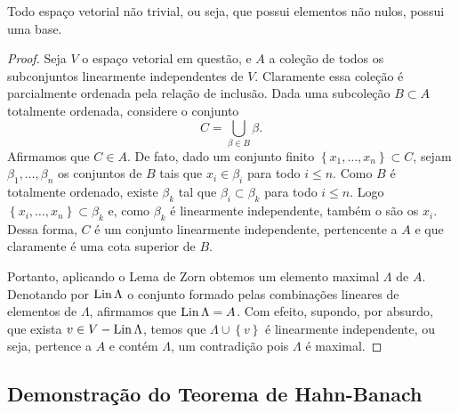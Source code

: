 \begin{prop}
    Todo espaço vetorial não trivial, ou seja, que possui elementos não nulos, possui uma base.
\end{prop}
\begin{proof}
    Seja \( V \) o espaço vetorial em questão, e \( A \) a coleção de todos os subconjuntos linearmente independentes de \( V \).
    Claramente essa coleção é parcialmente ordenada pela relação de inclusão.
    Dada uma subcoleção \( B \subset A \) totalmente ordenada, considere o conjunto \[
        C = \bigcup_{ \beta \in B } \beta
    .\]
    Afirmamos que \( C \in A \).
    De fato, dado um conjunto finito \( \left\{ x_{ 1 }, \dots, x_{ n } \right\} \subset C \), sejam \( \beta_{ 1 }, \dots, \beta_{ n } \) os conjuntos de \( B \) tais que \( x_{ i } \in \beta_{ i } \) para todo \( i \leq n \).
    Como \( B \) é totalmente ordenado, existe \( \beta_{ k } \) tal que \( \beta_{ i } \subset \beta_{ k } \) para todo \( i \leq n \).
    Logo \( \left\{ x_{ i }, \dots, x_{ n } \right\} \subset  \beta_{ k } \) e, como \( \beta_{ k } \) é linearmente independente, também o são os \( x_{ i } \).
    Dessa forma, \( C \) é um conjunto linearmente independente, pertencente a \( A \) e que claramente é uma cota superior de \( B \).

    Portanto, aplicando o Lema de Zorn obtemos um elemento maximal \( \Lambda \) de \( A \).
    Denotando por \( \operatorname{Lin} \Lambda \) o conjunto formado pelas combinações lineares de elementos de \( \Lambda \), afirmamos que \( \operatorname{Lin} \Lambda = A \).
    Com efeito, supondo, por absurdo, que exista \( v \in V - \operatorname{Lin} \Lambda \), temos que \( \Lambda \cup \left\{ v \right\} \) é linearmente independente, ou seja, pertence a \( A \) e contém \( \Lambda \), um contradição pois \( \Lambda \) é maximal.
\end{proof}

\subsection{Demonstração do Teorema de Hahn-Banach}

